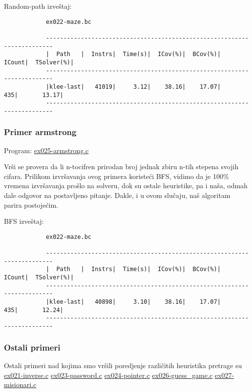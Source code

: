 \documentclass[a4paper]{article}
\begin{document}
{		Random-path izveštaj:
		
		\begin{verbatim}
			ex022-maze.bc
			
			------------------------------------------------------------------------
			|  Path   |  Instrs|  Time(s)|  ICov(%)|  BCov(%)|  ICount|  TSolver(%)|
			------------------------------------------------------------------------
			|klee-last|   41019|     3.12|    38.16|    17.07|     435|       13.17|
			------------------------------------------------------------------------
		\end{verbatim}
		
	\subsubsection{Primer armstrong}
		
		Program: \href{file:primeri/ex025-armstrong.c}{ex025-armstrong.c}
		
		Vrši se provera da li n-tocifren prirodan broj jednak zbiru n-tih stepena svojih cifara. Prilikom izvršavanja ovog primera koristeći BFS, vidimo da je 100\% vremena izvršavanja prošlo na solveru, dok su ostale heuristike, pa i naša, odmah dale odgovor na postavljeno pitanje. Dakle, i u ovom slučaju, naš algoritam parira postojećim.
		
		BFS izveštaj:
		
		\begin{verbatim}
			ex022-maze.bc
			
			------------------------------------------------------------------------
			|  Path   |  Instrs|  Time(s)|  ICov(%)|  BCov(%)|  ICount|  TSolver(%)|
			------------------------------------------------------------------------
			|klee-last|   40898|     3.10|    38.16|    17.07|     435|       12.24|
			------------------------------------------------------------------------
		\end{verbatim}
		
		
	\subsubsection{Ostali primeri}
		
		Ostali primeri nad kojima smo vršili poredjenje različitih heuristika pretrage su \href{file:primeri/ex021-inverse.c}{ex021-inverse.c}
		\href{file:primeri/ex023-password.c}{ex023-password.c}
		\href{file:primeri/ex024-pointer.c}{ex024-pointer.c}
		\href{file:primeri/ex026-guess_game.c}{ex026-guess\_game.c}
		\href{file:primeri/ex027-misionari.c}{ex027-misionari.c}
		
}
\end{document}
